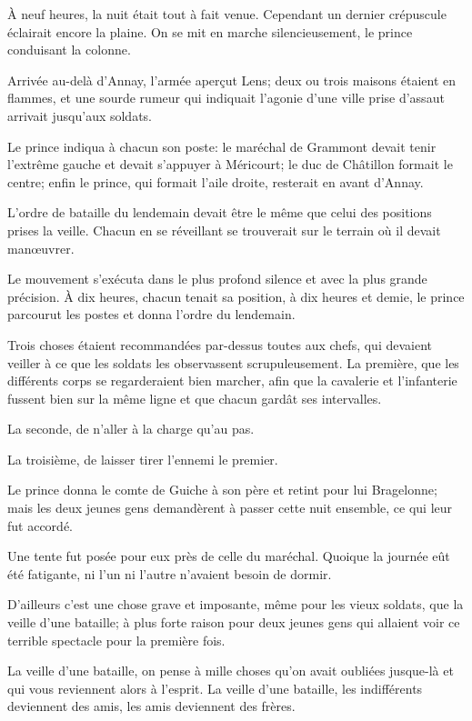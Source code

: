 À neuf heures, la nuit était tout à fait venue. Cependant un dernier crépuscule éclairait encore la plaine. On se mit en marche silencieusement, le prince conduisant la colonne.

Arrivée au-delà d'Annay, l'armée aperçut Lens; deux ou trois maisons étaient en flammes, et une sourde rumeur qui indiquait l'agonie d'une ville prise d'assaut arrivait jusqu'aux soldats.

Le prince indiqua à chacun son poste: le maréchal de Grammont devait tenir l'extrême gauche et devait s'appuyer à Méricourt; le duc de Châtillon formait le centre; enfin le prince, qui formait l'aile droite, resterait en avant d'Annay.

L'ordre de bataille du lendemain devait être le même que celui des positions prises la veille. Chacun en se réveillant se trouverait sur le terrain où il devait manœuvrer.

Le mouvement s'exécuta dans le plus profond silence et avec la plus grande précision. À dix heures, chacun tenait sa position, à dix heures et demie, le prince parcourut les postes et donna l'ordre du lendemain.

Trois choses étaient recommandées par-dessus toutes aux chefs, qui devaient veiller à ce que les soldats les observassent scrupuleusement. La première, que les différents corps se regarderaient bien marcher, afin que la cavalerie et l'infanterie fussent bien sur la même ligne et que chacun gardât ses intervalles.

La seconde, de n'aller à la charge qu'au pas.

La troisième, de laisser tirer l'ennemi le premier.

Le prince donna le comte de Guiche à son père et retint pour lui Bragelonne; mais les deux jeunes gens demandèrent à passer cette nuit ensemble, ce qui leur fut accordé.

Une tente fut posée pour eux près de celle du maréchal. Quoique la journée eût été fatigante, ni l'un ni l'autre n'avaient besoin de dormir.

D'ailleurs c'est une chose grave et imposante, même pour les vieux soldats, que la veille d'une bataille; à plus forte raison pour deux jeunes gens qui allaient voir ce terrible spectacle pour la première fois.

La veille d'une bataille, on pense à mille choses qu'on avait oubliées jusque-là et qui vous reviennent alors à l'esprit. La veille d'une bataille, les indifférents deviennent des amis, les amis deviennent des frères.

